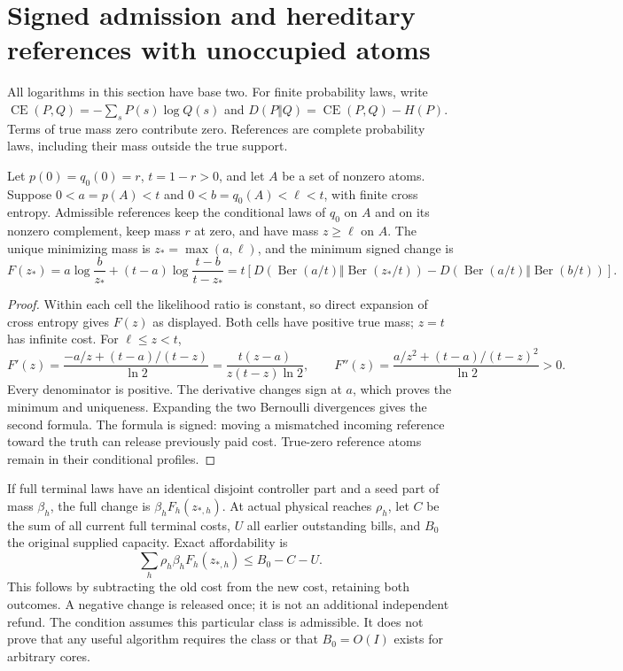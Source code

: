 \section{Signed admission and hereditary references with unoccupied atoms}
\label{sec:v11}
All logarithms in this section have base two. For finite probability laws, write
$\operatorname{CE}(P,Q)=-\sum_sP(s)\log Q(s)$ and
$D(P\Vert Q)=\operatorname{CE}(P,Q)-H(P)$. Terms of true mass zero contribute zero.
References are complete probability laws, including their mass outside the true support.

\begin{lemma}
\label{lem:v11-floor}
Let $p(0)=q_0(0)=r$, $t=1-r>0$, and let $A$ be a set of nonzero atoms.
Suppose $0<a=p(A)<t$ and $0<b=q_0(A)<\ell<t$, with finite cross entropy.
Admissible references keep the conditional laws of $q_0$ on $A$ and on its
nonzero complement, keep mass $r$ at zero, and have mass $z\geq\ell$ on $A$.
The unique minimizing mass is $z_* =\max(a,\ell)$, and the minimum signed change is
\[
 F(z_*)=a\log\frac b{z_*}+(t-a)\log\frac{t-b}{t-z_*}
 =t\left[D(\operatorname{Ber}(a/t)\Vert\operatorname{Ber}(z_*/t))
 -D(\operatorname{Ber}(a/t)\Vert\operatorname{Ber}(b/t))\right].
\]
\end{lemma}
\begin{proof}
Within each cell the likelihood ratio is constant, so direct expansion of cross entropy
gives $F(z)$ as displayed. Both cells have positive true mass; $z=t$ has infinite cost.
For $\ell\leq z<t$,
\[
 F'(z)=\frac{-a/z+(t-a)/(t-z)}{\ln2}
       =\frac{t(z-a)}{z(t-z)\ln2},\qquad
 F''(z)=\frac{a/z^2+(t-a)/(t-z)^2}{\ln2}>0.
\]
Every denominator is positive. The derivative changes sign at $a$, which proves the
minimum and uniqueness. Expanding the two Bernoulli divergences gives the second formula.
The formula is signed: moving a mismatched incoming reference toward the truth can release
previously paid cost. True-zero reference atoms remain in their conditional profiles.
\end{proof}

If full terminal laws have an identical disjoint controller part and a seed part of mass
$\beta_h$, the full change is $\beta_h F_h(z_{*,h})$. At actual physical reaches $\rho_h$,
let $C$ be the sum of all current full terminal costs, $U$ all earlier outstanding bills,
and $B_0$ the original supplied capacity. Exact affordability is
\[
 \sum_h\rho_h\beta_h F_h(z_{*,h})\leq B_0-C-U.
\]
This follows by subtracting the old cost from the new cost, retaining both outcomes.
A negative change is released once; it is not an additional independent refund.
The condition assumes this particular class is admissible. It does not prove that any
useful algorithm requires the class or that $B_0=O(I)$ exists for arbitrary cores.

